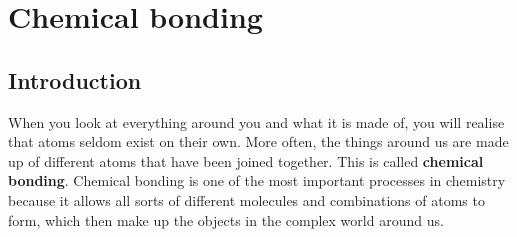          \chapter{Chemical bonding}
    \setcounter{figure}{1}
    \setcounter{subfigure}{1}
    \label{m38704*cid1}
            \section{Introduction}
            \nopagebreak
      \label{m38704*id138190}When you look at everything around you and what it is made of, you will realise that atoms seldom exist on their own. More often, the things around us are made up of different atoms that have been joined together. This is called \textbf{chemical bonding}. Chemical bonding is one of the most important processes in chemistry because it allows all sorts of different molecules and combinations of atoms to form, which then make up the objects in the complex world around us.\par 
{}
    \label{m38704*cid4}
